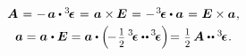 \nopagebreak\vspace{-0.25em}\begin{equation}\label{companionvector}
\begin{array}{c}
\bm{A} \hspace{.2ex} = \hspace{.1ex} - \hspace{.3ex} \bm{a} \dotp \permutationsparitytensor \hspace{.2ex} = \hspace{.2ex} \bm{a} \times\hspace{-0.1ex} \UnitDyad \hspace{.2ex} = \hspace{.1ex} - \hspace{.2ex} \permutationsparitytensor \dotp \bm{a} \hspace{.2ex} = \hspace{.1ex} \UnitDyad \times \bm{a}
\hspace{.1ex} ,
\\[.3em]
%
\bm{a} = \bm{a} \hspace{.1ex} \dotp \UnitDyad = \bm{a} \dotp \left( \hspace{-0.3ex} - \displaystyle \hspace{.2ex} \smalldisplaystyleonehalf \hspace{.4ex} \permutationsparitytensor \dotdotp \hspace{-0.1ex} \permutationsparitytensor \right) \hspace{-0.4ex} = \hspace{.1ex} \smalldisplaystyleonehalf \hspace{.32ex} \bm{A} \dotdotp \permutationsparitytensor
\hspace{.1ex} .
\end{array}
\end{equation}

